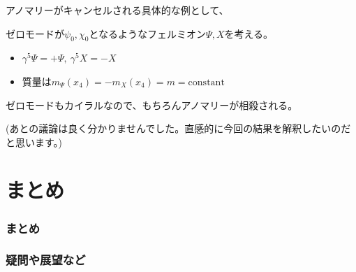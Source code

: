 \documentclass[
  unicode,a4paper,9pt,
  xcolor = {dvipsnames,svgnames},
  hyperref ={colorlinks=true,citecolor=Navy,linkcolor=NavyBlue,urlcolor=purple},
  ja=standard,lualatex
]{beamer}
\begin{document}
\begin{frame}
  \frametitle{\subsecname}

  アノマリーがキャンセルされる具体的な例として、

  ゼロモードが$\psi_{0},\chi_{0}$となるようなフェルミオン$\Psi,X$を考える。
  \begin{itemize}
    \item 
    $\gamma^{5}\Psi=+\Psi,\ \gamma^{5}X=-X$
    \item 
    質量は$m_{\Psi}(x_{4})=-m_{X}(x_{4})=m=\mathrm{constant}$
  \end{itemize}

  ゼロモードもカイラルなので、もちろんアノマリーが相殺される。  

  \vspace*{5pt}

  (あとの議論は良く分かりませんでした。直感的に今回の結果を解釈したいのだと思います。)

\end{frame}




\section{まとめ}

\begin{frame}[plain]
  \huge \secname
\end{frame}

\begin{frame}
  \frametitle{まとめ}




\end{frame}


\begin{frame}
  \frametitle{疑問や展望など}



\end{frame}



\setcounter{Appendix}{\value{framenumber}}
\setcounter{section}{0}
\renewcommand{\thesubsection}{\Alph{subsection}}
\makeatletter
\renewcommand{\theequation}{\thesubsection.\arabic{equation}}

\renewcommand{\thefigure}{\thesubsection.\arabic{figure}}

\renewcommand{\thetable}{\thesubsection.\arabic{table}}
\makeatother
\end{document}
